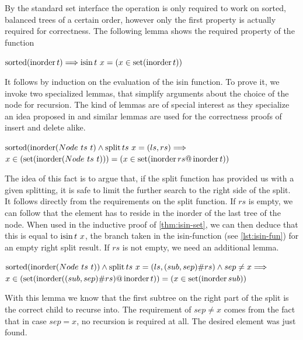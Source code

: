 By the standard set interface the operation is only required to work on
sorted, balanced trees of a certain order, however only the first property
is actually required for correctness.
The following lemma shows the required property of the function

\begin{theorem}
    \label{thm:isin-set}
    $\operatorname{sorted} (\operatorname{inorder} t) \Longrightarrow \operatorname{isin} t\ x = (x \in \operatorname{set} (\operatorname{inorder} t))$
\end{theorem}

It follows by induction on the evaluation of the isin function.
To prove it, we invoke two specialized lemmas,
that simplify arguments about the choice of the node for recursion.
The kind of lemmas are of special interest as they specialize
an idea proposed in \parencite{DBLP:conf/itp/Nipkow16} and similar lemmas
are used for the correctness proofs of insert and delete alike.

\begin{lemma}
    $\operatorname{sorted} (\operatorname{inorder} (Node\ ts\ t) \wedge \operatorname{split} ts\ x = (ls, rs) \Longrightarrow$ \\
    $x \in (\operatorname{set} (\operatorname{inorder} (Node\ ts\ t))) = (x \in \operatorname{set} (\operatorname{inorder} rs @ \operatorname{inorder} t))$
\end{lemma}

The idea of this fact is to argue that, if the split function has provided
us with a given splitting, it is safe to limit the further search
to the right side of the split.
It follows directly from the requirements on the split function.
If $rs$ is empty, we can follow that the element has to reside in the inorder
of the last tree of the node.
When used in the inductive proof of \autoref{thm:isin-set}, we can then deduce that this is
equal to $\operatorname{isin} t\ x$, the branch taken in the isin-function (see \autoref{lst:isin-fun}) for an empty right split result.
If $rs$ is not empty, we need an additional lemma.

\begin{lemma}
    $\operatorname{sorted} (\operatorname{inorder} (Node\ ts\ t)) \wedge \operatorname{split} ts\ x = (ls, (sub,sep)\#rs) \wedge sep \neq x \Longrightarrow$ \\
    $x \in (\operatorname{set} (\operatorname{inorder} ((sub,sep)\#rs) @ \operatorname{inorder} t)) = (x \in \operatorname{set} (\operatorname{inorder} sub))$
\end{lemma}

With this lemma we know that the first subtree on the right part of the split
is the correct child to recurse into.
The requirement of $sep \neq x$ comes from the fact that in case $sep = x$,
no recursion is required at all.
The desired element was just found.

